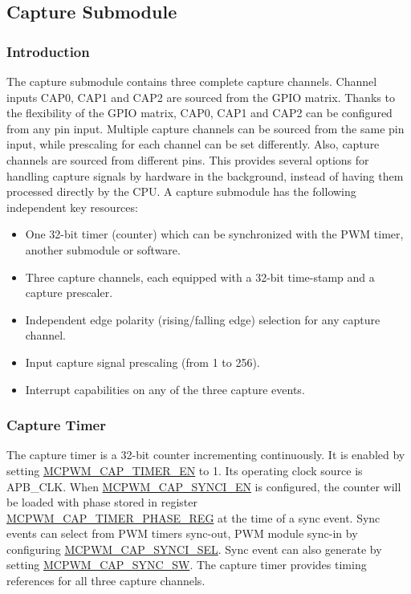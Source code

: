 \documentclass[main\_\_EN.tex]{subfiles}
\begin{document}
\subsection{Capture Submodule}
\subsubsection{Introduction}
The capture submodule contains three complete capture channels. Channel inputs CAP0, CAP1 and CAP2 are sourced from the GPIO matrix. Thanks to the flexibility of the GPIO matrix, CAP0, CAP1 and CAP2 can be configured from any pin input. Multiple capture channels can be sourced from the same pin input, while prescaling for each channel can be set differently. Also, capture channels are sourced from different pins. This provides several options for handling capture signals by hardware in the background, instead of having them processed directly by the CPU.
A capture submodule has the following independent key resources:
\begin{itemize}
    \item One 32-bit timer (counter) which can be synchronized with the PWM timer, another submodule or software.
    \item Three capture channels, each equipped with a 32-bit time-stamp and a capture prescaler.
    \item Independent edge polarity (rising/falling edge) selection for any capture channel.
    \item Input capture signal prescaling (from 1 to 256).
    \item Interrupt capabilities on any of the three capture events.
\end{itemize}

\subsubsection{Capture Timer}
The capture timer is a 32-bit counter incrementing continuously. It is enabled by setting \hyperref[fielddesc:MCPWMCAPTIMEREN]{MCPWM\_CAP\_TIMER\_EN} to 1. Its operating clock source is APB\_CLK. When \hyperref[fielddesc:MCPWMCAPSYNCIEN]{MCPWM\_CAP\_SYNCI\_EN} is configured, the counter will be loaded with phase stored in register\\\hyperref[regdesc:MCPWMCAPTIMERPHASEREG]{MCPWM\_CAP\_TIMER\_PHASE\_REG} at the time of a sync event. Sync events can select from PWM timers sync-out, PWM module sync-in by configuring \hyperref[fielddesc:MCPWMCAPSYNCISEL]{MCPWM\_CAP\_SYNCI\_SEL}. Sync event can also generate by setting \hyperref[fielddesc:MCPWMCAPSYNCSW]{MCPWM\_CAP\_SYNC\_SW}. The capture timer provides timing references for all three capture channels.
\end{document}
